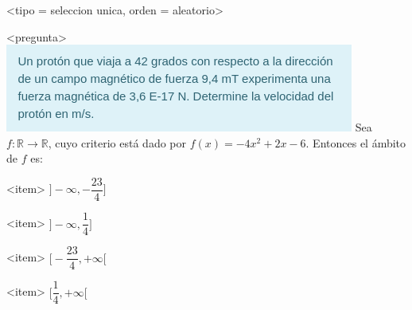 <tipo = seleccion unica, orden = aleatorio>

<pregunta>
\includegraphics{preg1.png}
Sea $f:\mathbb R \to \mathbb R$, cuyo criterio est\'a dado por $f(x) = -4x^2 +2x -6$. Entonces el \'ambito de $f$ es:


<item>
$\bigg]{-}\infty, -\dfrac{23}{4}\bigg]$

<item>
$\bigg]{-}\infty, \dfrac{1}{4}\bigg]$

<item>
$\bigg[-\dfrac{23}{4}, +\infty\bigg[$

<item>
$\bigg[\dfrac{1}{4}, +\infty\bigg[$



